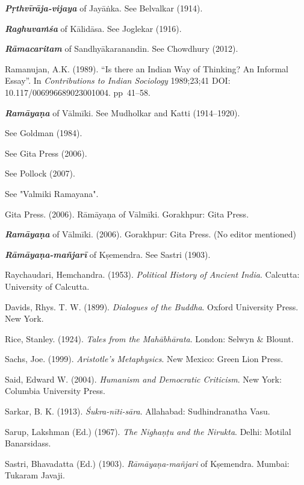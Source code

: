 \begin{thebibliography}{99}
{\sl\bfseries Pṛthvīrāja-vijaya} of Jayāṅka. See Belvalkar (1914).

{\sl\bfseries Raghuvaṁśa} of Kālidāsa. See Joglekar (1916).

{\sl\bfseries Rāmacaritam} of Sandhyākaranandin. See Chowdhury (2012).

Ramanujan, A.K. (1989). “Is there an Indian Way of Thinking? An Informal Essay”. In {\sl Contributions to Indian Sociology} 1989;23;41 DOI: 10.117/006996689023001004. pp~41--58.

{\sl\bfseries Ramāyaṇa} of Vālmīki. See Mudholkar and Katti (1914--1920).

See Goldman (1984).

See Gita Press (2006).

See Pollock (2007).

See "Valmiki Ramayana".

Gita Press. (2006). Rāmāyaṇa of Vālmīki. Gorakhpur: Gita Press.

{\sl\bfseries Ramāyaṇa} of Vālmīki. (2006). Gorakhpur: Gita Press. (No editor mentioned)

{\sl\bfseries Rāmāyaṇa-mañjarī} of Kṣemendra. See Sastri (1903).

Raychaudari, Hemchandra. (1953). {\sl Political History of Ancient India}. Calcutta: University of Calcutta.

Davids, Rhys. T. W. (1899). {\sl Dialogues of the Buddha}. Oxford University Press. New York.

Rice, Stanley. (1924). {\sl Tales from the Mahābhārata}. London: Selwyn \& Blount. 

Sachs, Joe. (1999). {\sl Aristotle’s Metaphysics}. New Mexico: Green Lion Press. 

Said, Edward W. (2004).  {\sl Humanism and Democratic Criticism}. New York: Columbia University Press. 

Sarkar, B. K. (1913). {\sl Śukra-nīti-sāra}. Allahabad: Sudhindranatha Vasu. 

Sarup, Lakshman (Ed.) (1967). {\sl The Nighaṇṭu and the Nirukta}. Delhi: Motilal Banarsidass.

Sastri, Bhavadatta (Ed.) (1903). {\sl Rāmāyaṇa-mañjari} of Kṣemendra. Mumbai: Tukaram Javaji. 


\end{thebibliography}
